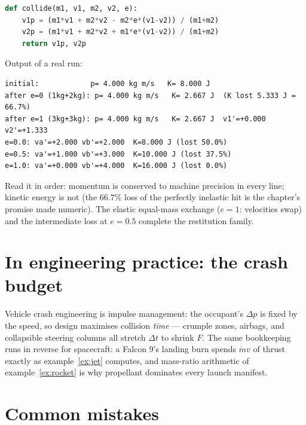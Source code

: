 \begin{lstlisting}[language=Python,caption={\texttt{code/ch03\_collision\_chain.py} --- event-stepped collisions: $p$ survives, $K$ audits the loss.},label={lst:coll}]
def collide(m1, v1, m2, v2, e):
    v1p = (m1*v1 + m2*v2 - m2*e*(v1-v2)) / (m1+m2)
    v2p = (m1*v1 + m2*v2 + m1*e*(v1-v2)) / (m1+m2)
    return v1p, v2p
\end{lstlisting}

Output of a real run:
\begin{lstlisting}[numbers=none]
initial:            p= 4.000 kg m/s   K= 8.000 J
after e=0 (1kg+2kg): p= 4.000 kg m/s   K= 2.667 J  (K lost 5.333 J = 66.7%)
after e=1 (3kg+3kg): p= 4.000 kg m/s   K= 2.667 J  v1'=+0.000 v2'=+1.333
e=0.0: va'=+2.000 vb'=+2.000  K=8.000 J (lost 50.0%)
e=0.5: va'=+1.000 vb'=+3.000  K=10.000 J (lost 37.5%)
e=1.0: va'=+0.000 vb'=+4.000  K=16.000 J (lost 0.0%)
\end{lstlisting}

Read it in order: momentum is conserved to machine precision in every line;
kinetic energy is not (the $66.7\%$ loss of the perfectly inelastic hit is
the chapter's promise made numeric). The elastic equal-mass exchange
($e=1$: velocities swap) and the intermediate loss at $e=0.5$ complete the
restitution family.

\section{In engineering practice: the crash budget}\label{sec:mom-eng}

Vehicle crash engineering is impulse management: the occupant's $\Delta p$
is fixed by the speed, so design maximises collision \emph{time} ---
crumple zones, airbags, and collapsible steering columns all stretch
$\Delta t$ to shrink $F$. The same bookkeeping runs in reverse for
spacecraft: a Falcon 9's landing burn spends $\dot m v$ of thrust exactly
as example~\ref{ex:jet} computes, and mass-ratio arithmetic of
example~\ref{ex:rocket} is why propellant dominates every launch manifest.

\section{Common mistakes}\label{sec:mom-mistakes}

